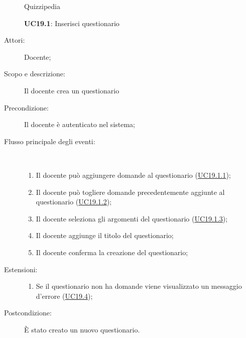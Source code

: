 \begin{figure}[H]
	\centering
	\begin{resizedtikzpicture}{\textwidth}
		\begin{umlsystem}[x=0, fill=lightgray!20]{Quizzipedia}
		\end{umlsystem}
	\end{resizedtikzpicture}
	\caption{\textbf{UC19.1}: Inserisci questionario}
	\label{UC19.1}
\end{figure}
\begin{description}
	\item[Attori:] Docente;
	\item[Scopo e descrizione:] Il docente crea un questionario
	\item[Precondizione:] Il docente è autenticato nel sistema;
	
	\item[Flusso principale degli eventi:] \ 
	\begin{enumerate}
		\item Il docente può aggiungere domande al questionario (\hyperlink{UC19.1.1}{UC19.1.1});
		\item Il docente può togliere domande precedentemente aggiunte al questionario (\hyperlink{UC19.1.2}{UC19.1.2});
		\item Il docente seleziona gli argomenti del questionario (\hyperlink{UC19.1.3}{UC19.1.3});
		\item Il docente aggiunge il titolo del questionario;
		\item Il docente conferma la creazione del questionario;
		
	\end{enumerate}
	\item[Estensioni:]
	\begin{enumerate}
		\item Se il questionario non ha domande viene visualizzato un messaggio d'errore (\hyperlink{UC19.4}{UC19.4});
		
	\end{enumerate}
	\item[Postcondizione:] È stato creato un nuovo questionario.
\end{description}
\hypertarget{UC19.1.1}{}
